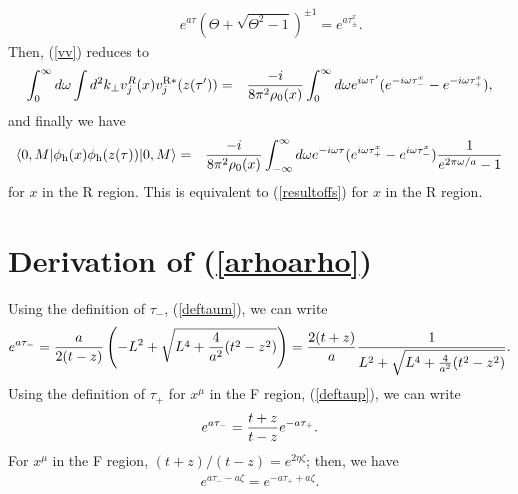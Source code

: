 \documentclass[aps,prd,preprintnumbers,nofootinbib,showpacs]{revtex4}%
\begin{document}
\begin{widetext}
\begin{eqnarray}
&&e^{a\tau}(\Theta+\sqrt{\Theta^2-1})^{\pm1} =e^{a\tau_\pm^x}.
\end{eqnarray}
Then, (\ref{vv}) reduces to
\begin{eqnarray}
\int_0^\infty d\omega \int d^2k_\perp v_j^R(x)v_j^{\rm R*}(z(\tau'))
&=&{ -i\over 8\pi^2\rho_0(x)} 
\int_0^\infty d\omega e^{i\omega\tau'} (e^{-i\omega\tau_-^x}-e^{-i\omega\tau_+^x}),
\end{eqnarray}
and finally we have 
\begin{eqnarray}
\langle0,M|\phi_{\rm h}(x)\phi_{\rm h}(z(\tau))|0,M\rangle
&=&{ -i\over 8\pi^2\rho_0(x)} 
\int_{-\infty}^{\infty} d\omega e^{-i\omega\tau} (e^{i\omega\tau_+^x}-e^{i\omega\tau_-^x}){1\over e^{2\pi\omega/a}-1}
\end{eqnarray}
for $x$ in the R region. This is equivalent to (\ref{resultoffs}) for $x$ in the R region. 


\section{Derivation of (\ref{arhoarho})}
Using the definition of $\tau_-$, (\ref{deftaum}), we can write
\begin{eqnarray}
e^{a\tau_-}={a\over 2(t-z)}\left(-L^2+\sqrt{L^4+{4\over a^2}(t^2-z^2)}\right)
={2(t+z)\over a}{1\over L^2+\sqrt{L^4+{4\over a^2}(t^2-z^2)}}.
\end{eqnarray}
Using the definition of $\tau_+$ for $x^\mu$ in the F region, 
(\ref{deftaup}), we can write
\begin{eqnarray}
e^{a\tau_-}={t+z\over t-z}e^{-a\tau_+}.
\end{eqnarray}
For $x^\mu$ in the F region, $(t+z)/(t-z)=e^{2\eta\zeta}$; then, we have
\begin{eqnarray}
e^{a\tau_--a\zeta}=e^{-a\tau_++a\zeta}.
\end{eqnarray}


\end{widetext}
\end{document}
